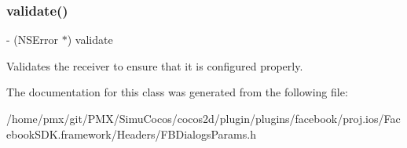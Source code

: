 \subsubsection{\texorpdfstring{validate()}{validate()}\hspace{0.1cm}{\footnotesize\ttfamily [5/5]}}
{\footnotesize\ttfamily -\/ (N\+S\+Error $\ast$) validate \begin{DoxyParamCaption}{ }\end{DoxyParamCaption}}

Validates the receiver to ensure that it is configured properly. 

The documentation for this class was generated from the following file\+:\begin{DoxyCompactItemize}
\item 
/home/pmx/git/\+P\+M\+X/\+Simu\+Cocos/cocos2d/plugin/plugins/facebook/proj.\+ios/\+Facebook\+S\+D\+K.\+framework/\+Headers/F\+B\+Dialogs\+Params.\+h\end{DoxyCompactItemize}
